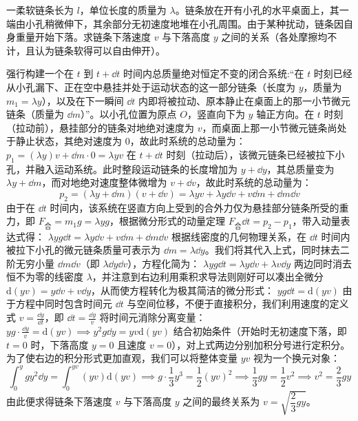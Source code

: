 \documentclass[lang=cn,11pt]{elegantbook}
\begin{document}
\begin{example}
一柔软链条长为 $l$，单位长度的质量为 $\lambda$。链条放在开有小孔的水平桌面上，其一端由小孔稍微伸下，其余部分无初速度地堆在小孔周围。由于某种扰动，链条因自身重量开始下落。求链条下落速度 $v$ 与下落高度 $y$ 之间的关系（各处摩擦均不计，且认为链条软得可以自由伸开）。
\end{example}
\begin{solution}
强行构建一个在 $t$ 到 $t+\dd t$ 时间内总质量绝对恒定不变的闭合系统:“在 $t$ 时刻已经从小孔漏下、正在空中悬挂并处于运动状态的这一部分链条（长度为 $y$，质量为 $m_1 = \lambda y$），以及在下一瞬间 $\dd t$ 内即将被拉动、原本静止在桌面上的那一小节微元链条（质量为 $\dd m$）”。以小孔位置为原点 $O$，竖直向下为 $y$ 轴正方向。在 $t$ 时刻（拉动前），悬挂部分的链条对地绝对速度为 $v$，而桌面上那一小节微元链条尚处于静止状态，其绝对速度为 $0$，故此时系统的总动量为：
 \(p_1 = (\lambda y)v + \dd m \cdot 0 = \lambda yv\) 
在 $t+\dd t$ 时刻（拉动后），该微元链条已经被拉下小孔，并融入运动系统。此时整段运动链条的长度增加为 $y+\dd y$，其总质量变为 $\lambda y + \dd m$，而对地绝对速度整体微增为 $v+\dd v$，故此时系统的总动量为：
\[
p_2 = (\lambda y + \dd m)(v + \dd v) = \lambda yv + \lambda y\dd v + v\dd m + \dd m\dd v
\]
由于在 $\dd t$ 时间内，该系统在竖直方向上受到的合外力仅为悬挂部分链条所受的重力，即 $F_{\text{合}} = m_1 g = \lambda yg$，根据微分形式的动量定理 $F_{\text{合}}\dd t = p_2 - p_1$，带入动量表达式得：
 \(\lambda yg\dd t = \lambda y\dd v + v\dd m + \dd m\dd v\) 
根据线密度的几何物理关系，在 $\dd t$ 时间内被拉下小孔的微元链条质量可表示为 $\dd m = \lambda \dd y$。我们将其代入上式，同时抹去二阶无穷小量 $\dd m\dd v$（即 $\lambda \dd y\dd v$），方程化简为：
 \(\lambda yg\dd t = \lambda y\dd v + \lambda v\dd y\) 
两边同时消去恒不为零的线密度 $\lambda$，并注意到右边利用乘积求导法则刚好可以凑出全微分 $\mathrm{d}(yv) = y\dd v + v\dd y$，从而使方程转化为极其简洁的微分形式：
 \(yg\dd t = \mathrm{d}(yv)\) 
由于方程中同时包含时间元 $\dd t$ 与空间位移，不便于直接积分，我们利用速度的定义式 $v = \frac{\dd y}{\dd t}$，即 $\dd t = \frac{\dd y}{v}$ 将时间元消除分离变量：
 \(yg \cdot \frac{\dd y}{v} = \mathrm{d}(yv) \implies y^2g\dd y = yv\mathrm{d}(yv)\) 
结合初始条件（开始时无初速度下落，即 $t=0$ 时，下落高度 $y=0$ 且速度 $v=0$），对上式两边分别加积分号进行定积分。为了使右边的积分形式更加直观，我们可以将整体变量 $yv$ 视为一个换元对象：
\[
\int_{0}^{y} gy^2\dd y = \int_{0}^{yv} (yv)\mathrm{d}(yv) \implies g \cdot \frac{1}{3}y^3 = \frac{1}{2}(yv)^2
\implies
\frac{1}{3}gy = \frac{1}{2}v^2 \implies v^2 = \frac{2}{3}gy
\]
由此便求得链条下落速度 $v$ 与下落高度 $y$ 之间的最终关系为 $v = \sqrt{\dfrac{2}{3}gy}$。
\end{solution}
\end{document}
